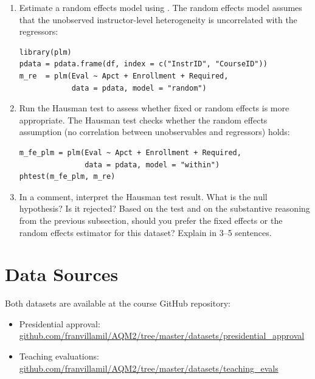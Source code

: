 \begin{enumerate}[label=\alph*)]
  \item Estimate a random effects model using . The random effects model assumes that the unobserved instructor-level heterogeneity is uncorrelated with the regressors:
  \begin{lstlisting}
library(plm)
pdata = pdata.frame(df, index = c("InstrID", "CourseID"))
m_re  = plm(Eval ~ Apct + Enrollment + Required,
            data = pdata, model = "random")
  \end{lstlisting}
  \item Run the Hausman test to assess whether fixed or random effects is more appropriate. The Hausman test checks whether the random effects assumption (no correlation between unobservables and regressors) holds:
  \begin{lstlisting}
m_fe_plm = plm(Eval ~ Apct + Enrollment + Required,
               data = pdata, model = "within")
phtest(m_fe_plm, m_re)
  \end{lstlisting}
  \item In a comment, interpret the Hausman test result. What is the null hypothesis? Is it rejected? Based on the test and on the substantive reasoning from the previous subsection, should you prefer the fixed effects or the random effects estimator for this dataset? Explain in 3--5 sentences.
\end{enumerate}

\vspace{15pt}

\section{Data Sources}

Both datasets are available at the course GitHub repository:
\begin{itemize}
  \item Presidential approval: \href{https://github.com/franvillamil/AQM2/tree/master/datasets/presidential_approval}{github.com/franvillamil/AQM2/tree/master/datasets/presidential\_approval}
  \item Teaching evaluations: \href{https://github.com/franvillamil/AQM2/tree/master/datasets/teaching_evals}{github.com/franvillamil/AQM2/tree/master/datasets/teaching\_evals}
\end{itemize}

